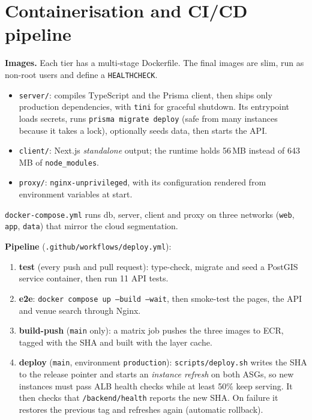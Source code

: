 \documentclass[10pt,a4paper]{article}
\begin{document}
\section{Containerisation and CI/CD pipeline}
\textbf{Images.} Each tier has a multi-stage Dockerfile. The final images are
slim, run as non-root users and define a \texttt{HEALTHCHECK}.
\begin{itemize}
  \item \texttt{server/}: compiles TypeScript and the Prisma client, then ships
  only production dependencies, with \texttt{tini} for graceful shutdown. Its
  entrypoint loads secrets, runs \texttt{prisma migrate deploy} (safe from many
  instances because it takes a lock), optionally seeds data, then starts the API.
  \item \texttt{client/}: Next.js \emph{standalone} output; the runtime holds
  56\,MB instead of 643\,MB of \texttt{node\_modules}.
  \item \texttt{proxy/}: \texttt{nginx-unprivileged}, with its configuration
  rendered from environment variables at start.
\end{itemize}
\texttt{docker-compose.yml} runs db, server, client and proxy on three networks
(\texttt{web}, \texttt{app}, \texttt{data}) that mirror the cloud segmentation.

\textbf{Pipeline} (\texttt{.github/workflows/deploy.yml}):
\begin{enumerate}
  \item \textbf{test} (every push and pull request): type-check, migrate and
  seed a PostGIS service container, then run 11 API tests.
  \item \textbf{e2e}: \texttt{docker compose up --build --wait}, then smoke-test
  the pages, the API and venue search through Nginx.
  \item \textbf{build-push} (\texttt{main} only): a matrix job pushes the three
  images to ECR, tagged with the SHA and built with the layer cache.
  \item \textbf{deploy} (\texttt{main}, environment \texttt{production}):
  \texttt{scripts/deploy.sh} writes the SHA to the release pointer and starts an
  \emph{instance refresh} on both ASGs, so new instances must pass ALB health
  checks while at least 50\% keep serving. It then checks that
  \texttt{/backend/health} reports the new SHA. On failure it restores the
  previous tag and refreshes again (automatic rollback).
\end{enumerate}
\end{document}

